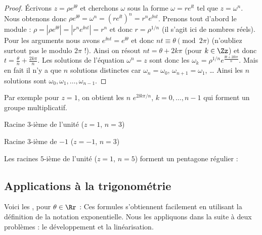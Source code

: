\documentclass[class=report,crop=false]{standalone}
\begin{document}
\begin{proof}
\'Ecrivons $z= \rho e^{\ii \theta}$ et cherchons $\omega$ sous la forme
$\omega=re^{\ii t}$ tel que $z=\omega^n$.
Nous obtenons donc $ \rho e^{\ii \theta} =\omega ^n = \left(re^{\ii t}\right)^n
= r^n e^{\ii nt}$.
Prenons tout d'abord le module : $ \rho = \left|\rho e^{\ii \theta} \right|
=  \left|r^n e^{\ii nt}\right| = r^n$ et donc $r = \rho^{1/n}$ (il s'agit ici de nombres réels).
Pour les arguments nous avons $e^{\ii nt} = e^{\ii \theta}$ et donc
$nt \equiv \theta \pmod {2\pi}$ (n'oubliez surtout pas le modulo $2\pi$ !).
Ainsi on résout $nt = \theta + 2k\pi$ (pour $k\in\Zz$) et donc $t = \frac{\theta}{n} + \frac{2k\pi}{n}$.
Les solutions de l'équation $\omega^n=z$ sont donc les $\omega_k = \rho^{1/n} e^{\frac{\ii\theta + 2\ii k\pi}{n}}$.
Mais en fait il n'y a que $n$ solutions distinctes car $\omega_n=\omega_0$, $\omega_{n+1}=\omega_1$, \ldots
Ainsi les $n$ solutions sont $\omega_0,\omega_1,\ldots,\omega_{n-1}$.

\end{proof}


Par exemple pour $z = 1$, on obtient les $n$ 
$e^{2 \ii k \pi / n}$, $k=0,\ldots,n-1$ qui forment un groupe multiplicatif.

\begin{minipage}{0.5\textwidth}
\vspace*{-2ex}
\centerline{Racine $3$-ième de l'unité ($z=1$, $n=3$)}
\end{minipage}
\begin{minipage}{0.5\textwidth}
\vspace*{-2ex}
\centerline{Racine $3$-ième de $-1$ ($z=-1$, $n=3$)}
\end{minipage}

\bigskip
Les racines $5$-ième de l'unité ($z=1$, $n=5$)
forment un pentagone régulier :


\subsection{Applications à la trigonométrie}

Voici les , pour $\theta \in \Rr$ :
Ces formules s'obtiennent facilement en utilisant la définition de la notation exponentielle.
Nous les appliquons dans la suite à deux problèmes : le développement et la linéarisation.
\end{document}
